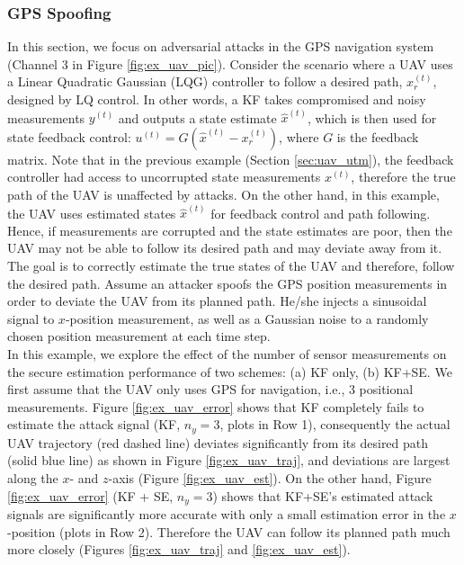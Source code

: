 \documentclass[twocolumn]{autart}    %
\begin{document}
\subsubsection{GPS Spoofing}
\vspace{-0.4cm}
In this section, we focus on adversarial attacks in the GPS navigation system (Channel 3 in Figure \ref{fig:ex_uav_pic}). Consider the scenario where a UAV uses a Linear Quadratic Gaussian (LQG) controller to follow a desired path, $x_r^{(t)}$, designed by LQ control. In other words, a KF takes compromised and noisy measurements $y^{(t)}$ and outputs a state estimate $\hat x^{(t)}$, which is then used for state feedback control: $u^{(t)} = G (\hat x^{(t)} - x_r^{(t)})$, where $G$ is the feedback matrix. Note that in the previous example (Section \ref{sec:uav_utm}), the feedback controller had access to uncorrupted state measurements $x^{(t)}$, therefore the true path of the UAV is unaffected by attacks. On the other hand, in this example, the UAV uses estimated states $\hat x^{(t)}$ for feedback control and path following. Hence, if measurements are corrupted and the state estimates are poor, then the UAV may not be able to follow its desired path and may deviate away from it. The goal is to correctly estimate the true states of the UAV and therefore, follow the desired path. Assume an attacker spoofs the GPS position measurements in order to deviate the UAV from its planned path. He/she injects a sinusoidal signal to $x$-position measurement, as well as a Gaussian noise to a randomly chosen position measurement at each time step. 
\\
In this example, we explore the effect of the number of sensor measurements on the secure estimation performance of two schemes: (a) KF only, (b) KF+SE.
We first assume that the UAV only uses GPS for navigation, i.e., 3 positional measurements. 
Figure \ref{fig:ex_uav_error} shows that KF completely fails to estimate the attack signal (KF, $n_y = 3$, plots in Row 1), %
consequently the actual UAV trajectory (red dashed line)  deviates significantly from its desired path (solid blue line) as shown in Figure \ref{fig:ex_uav_traj}, and deviations are largest along the $x$- and $z$-axis (Figure \ref{fig:ex_uav_est}).
On the other hand, Figure \ref{fig:ex_uav_error} (KF + SE, $n_y = 3$) shows that KF+SE's estimated attack signals are significantly more accurate with only a small estimation error in the $x$-position (plots in Row 2). 
Therefore the UAV can follow its planned path much more closely (Figures \ref{fig:ex_uav_traj}  and \ref{fig:ex_uav_est}).
\end{document}
